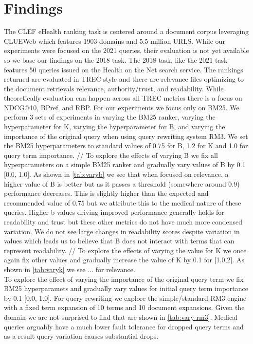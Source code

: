 \documentclass[11pt]{article}
\begin{document}
\section{Findings}
The CLEF eHealth ranking task is centered around a document corpus leveraging CLUEWeb which features 1903 domains and 5.5 million URLS. While our experiments were focused on the 2021 queries, their evaluation is not yet available so we base our findings on the 2018 task. The 2018 task, like the 2021 task features 50 queries issued on the Health on the Net search service. The rankings returned are evaluated in TREC style and there are relevance files optimizing to the document retrievals relevance, authority/trust, and readability. While theoretically evaluation can happen across all TREC metrics there is a focus on NDCG@10, BPref, and RBP. For our experiments we focus only on BM25. We perform 3 sets of experiments in varying the BM25 ranker, varying the hyperparameter for K, varying the hyperparameter for B, and varying the importance of the original query when using query rewriting system RM3. We set the BM25 hyperparameters to standard values of 0.75 for B, 1.2 for K and 1.0 for query term importance. //
To explore the effects of varying B we fix all hyperparameters on a simple BM25 ranker and gradually vary values of B by 0.1 [0.0, 1.0]. As shown in \ref{tab:varyb} we see that when focused on relevance, a higher value of B is better but as it passes a threshold (somewhere around 0.9) performance decreases. This is slightly higher than the expected and recommended value of 0.75 but we attribute this to the medical nature of these queries. Higher b values driving improved performance generally holds for readability and trust but these other metrics do not have much more condensed variation. We do not see large changes in readability scores despite variation in values which leads us to believe that B does not interact with terms that can represent readability. //
To explore the effects of varying the value for K we once again fix other values and gradually increase the value of K by 0.1 for [1.0,2]. As shown in \ref{tab:varyk} we see ... for relevance.  \\
To explore the effect of varying the importance of the original query term we fix BM25 hyperparamets and gradually vary values for initial query term importance by 0.1 [0.0, 1.0]. For query rewriting we explore the simple/standard RM3 engine with a fixed term expansion of 10 terms and 10 document expansions. Given the domain we are not surprised to find that are shown in \ref{tab:vary-rm3}. Medical queries arguably have a much lower fault tolerance for dropped query terms and as a result query variation causes substantial drops. 
\end{document}
